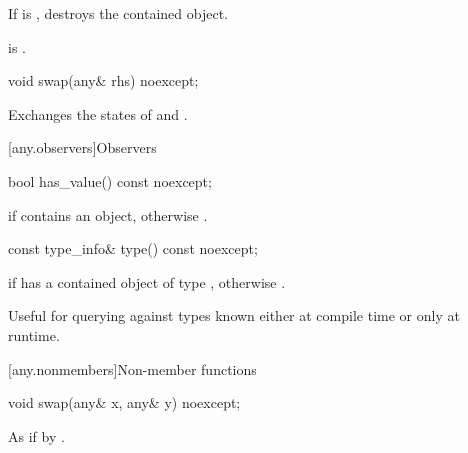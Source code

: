 \begin{itemdescr}
\pnum
\effects
If  is , destroys the contained object.

\pnum
\postcondition
{} is .
\end{itemdescr}

%
\begin{itemdecl}
void swap(any& rhs) noexcept;
\end{itemdecl}

\begin{itemdescr}

\pnum
\effects
Exchanges the states of  and .
\end{itemdescr}

[any.observers]{Observers}

%
\begin{itemdecl}
bool has_value() const noexcept;
\end{itemdecl}

\begin{itemdescr}
\pnum
\returns
{} if  contains an object, otherwise .
\end{itemdescr}

%
\begin{itemdecl}
const type_info& type() const noexcept;
\end{itemdecl}

\begin{itemdescr}
\pnum
\returns
{} if  has a contained object of type ,
otherwise .

\pnum
\begin{note}
Useful for querying against types known either at compile time or only at runtime.
\end{note}
\end{itemdescr}

[any.nonmembers]{Non-member functions}

%
\begin{itemdecl}
void swap(any& x, any& y) noexcept;
\end{itemdecl}

\begin{itemdescr}
\pnum
\effects
As if by .
\end{itemdescr}

